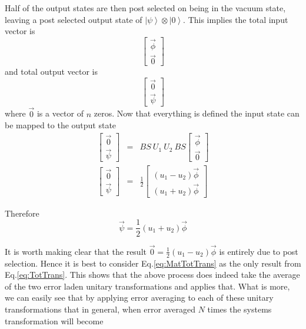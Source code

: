 \documentclass[aps,pra,twocolumn,superscriptaddress,numerical]{revtex4-1}
\begin{document}
Half of the output states are then post selected on being in the vacuum state, leaving a post selected output state of $\left|\psi\right\rangle \otimes\left|0\right\rangle $. This implies the total input vector is
\begin{equation}
	\begin{bmatrix}\vec{\phi}\\
		\vec{0}
	\end{bmatrix}
\end{equation}
and total output vector is
\begin{equation}
	\begin{bmatrix}\vec{0}\\
		\vec{\psi}
		\end{bmatrix}
\end{equation}
where $\vec{0}$ is a vector of $n$ zeros. Now that everything is defined the input state can be mapped to the output state
\begin{eqnarray}
	\begin{bmatrix}\vec{0}\\
		\vec{\psi}
	\end{bmatrix} & = & BS\ U_{1}\ U_{2}\ BS\begin{bmatrix}\vec{\phi}\\
			\vec{0}
			\end{bmatrix}\nonumber \\
			\begin{bmatrix}\vec{0}\\
			\vec{\psi}
			\end{bmatrix} & = & \frac{1}{2}\begin{bmatrix}\left(u_{1}-\ensuremath{u_{2}}\right)\vec{\phi}\\
			\left(u_{1}+\ensuremath{u_{2}}\right)\vec{\phi}
			\end{bmatrix}\label{eq:TotTrans}
		\end{eqnarray}

Therefore
\begin{equation}
	\vec{\psi}=\frac{1}{2}\left(u_{1}+\ensuremath{u_{2}}\right)\vec{\phi}\label{eq:MatTotTrans}
\end{equation}

It is worth making clear that the result $\vec{0}=\frac{1}{2}\left(u_{1}-\ensuremath{u_{2}}\right)\vec{\phi}$ is entirely due to post selection. Hence it is best to consider Eq.\ref{eq:MatTotTrans} as the only result from Eq.\ref{eq:TotTrans}. This shows that the above process does indeed take the average of the two error laden unitary transformations and applies that. What is more, we can easily see that by applying error averaging to each of these unitary transformations that in general, when error averaged $N$ times the systems transformation will become
\end{document}
